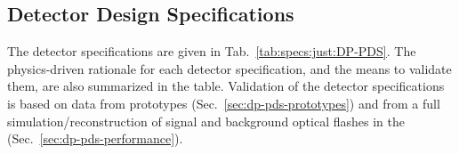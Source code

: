 \subsection{Detector Design Specifications}
\label{sec:dp-pds-overview_specs}

The \dual {} detector specifications are given in Tab.~\ref{tab:specs:just:DP-PDS}. The physics-driven rationale for each detector specification, and the means to validate them, are also summarized in the table. Validation of the detector specifications is based on data from  prototypes (Sec.~\ref{sec:dp-pds-prototypes}) and from a full simulation/reconstruction of signal and background optical flashes in the \dpmod (Sec.~\ref{sec:dp-pds-performance}). 

\begin{comment}
\begin{dunetable}
[Summary of tentative requirements for the \dword{dpmod} \dword{pds}] %
{p{0.3\textwidth} p{0.25\textwidth} p{0.45\textwidth}}
{tab:dppd_t_1_3}
{Summary of tentative requirements for the \dword{dpmod} \dword{pds}. %
This table represents the baseline choice for the R5912-MOD20 \dword{pmt} as manufactured by Hamamatsu Photonics \cite{hamamatsu-5912} is made.}
\footnotesize
{\bf Feature}	& {\bf Goal}  	& {\bf Comment	}	\\
\toprowrule
\multicolumn{3}{l}{\bf Optical} \\ \specialrule{1.5pt}{1pt}{1pt}
Spectral response & \SI{127}{nm} 	& Wavelength shifters are required.				\\
Light yield & 2.5 \phel/\si{MeV} & For \dword{pddp}, final value depends on simulation results.\\
\toprowrule
\multicolumn{3}{l}{\bf Electronic} \\ \specialrule{1.5pt}{1pt}{1pt}
Minimum light signal & SPE & Required to perform the \dword{pmt} gain measurement. \\
Gain			& $\sim$\num{e6}-\num{e9} & Given by \dword{pmt} specifications.			\\
Noise (or signal/noise) &  <\SI{1}{mV} & To distinguish SPE from noise, depends on \dword{pmt} gain. \\

\end{comment}
